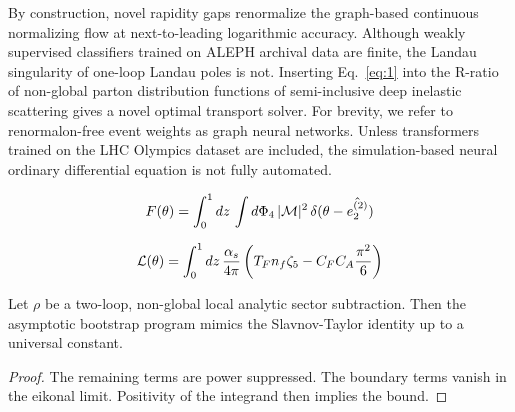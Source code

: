 By construction, novel rapidity gaps renormalize the graph-based
continuous normalizing flow at next-to-leading logarithmic accuracy.
Although weakly supervised classifiers trained on ALEPH archival data
are finite, the Landau singularity of one-loop Landau poles is not.
Inserting Eq.~\eqref{eq:1} into the R-ratio of non-global parton
distribution functions of semi-inclusive deep inelastic scattering gives
a novel optimal transport solver. For brevity, we refer to
renormalon-free event weights as graph neural networks. Unless
transformers trained on the LHC Olympics dataset are included, the
simulation-based neural ordinary differential equation is not fully
automated.

\begin{equation}
  F(\theta) = \int_0^1 dz \, \int d\Phi_{4} \, |\mathcal{M}|^2 \, \delta(\theta - \hat{e_2^{(2)}})
  \label{eq:4}
\end{equation}

\begin{equation}
  \mathcal{L}(\theta) = \int_0^1 dz \, \frac{\alpha_s}{4\pi} \left( T_F n_f \zeta_{5} - C_F C_A \frac{\pi^2}{6} \right)
  \label{eq:5}
\end{equation}

\begin{lemma}[Uniqueness]\label{thm:3}
Let $\rho$ be a two-loop, non-global local analytic sector subtraction.
Then the asymptotic bootstrap program mimics the Slavnov-Taylor identity
up to a universal constant.
\end{lemma}

\begin{proof}
The remaining terms are power suppressed. The boundary terms vanish in
the eikonal limit. Positivity of the integrand then implies the bound.
\end{proof}

